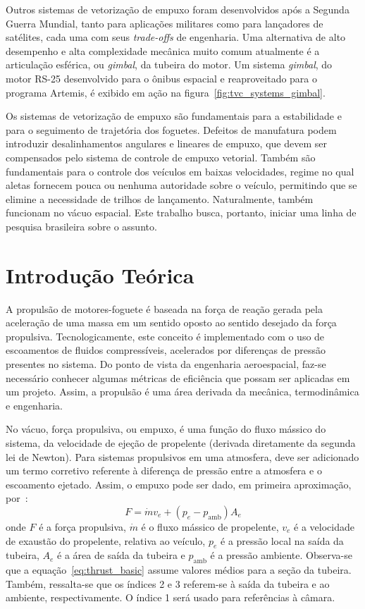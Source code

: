 Outros sistemas de vetorização de empuxo foram desenvolvidos após a Segunda Guerra Mundial, tanto para aplicações militares como para lançadores de satélites, cada uma com seus \textit{trade-offs} de engenharia. Uma alternativa de alto desempenho e alta complexidade mecânica muito comum atualmente é a articulação esférica, ou \textit{gimbal}, da tubeira do motor. Um sistema \textit{gimbal}, do motor RS-25 desenvolvido para o ônibus espacial e reaproveitado para o programa Artemis, é exibido em ação na figura~\ref{fig:tvc_systems_gimbal}.

Os sistemas de vetorização de empuxo são fundamentais para a estabilidade e para o seguimento de trajetória dos foguetes. Defeitos de manufatura podem introduzir desalinhamentos angulares e lineares de empuxo, que devem ser compensados pelo sistema de controle de empuxo vetorial. Também são fundamentais para o controle dos veículos em baixas velocidades, regime no qual aletas fornecem pouca ou nenhuma autoridade sobre o veículo, permitindo que se elimine a necessidade de trilhos de lançamento. Naturalmente, também funcionam no vácuo espacial. Este trabalho busca, portanto, iniciar uma linha de pesquisa brasileira sobre o assunto.

\section{Introdução Teórica}\label{sec:intro}
A propulsão de motores-foguete é baseada na força de reação gerada pela aceleração de uma massa em um sentido oposto ao sentido desejado da força propulsiva. Tecnologicamente, este conceito é implementado com o uso de escoamentos de fluidos compressíveis, acelerados por diferenças de pressão presentes no sistema. Do ponto de vista da engenharia aeroespacial, faz-se necessário conhecer algumas métricas de eficiência que possam ser aplicadas em um projeto. Assim, a propulsão é uma área derivada da mecânica, termodinâmica e engenharia.

No vácuo, força propulsiva, ou empuxo, é uma função do fluxo mássico do sistema, da velocidade de ejeção de propelente (derivada diretamente da segunda lei de Newton). Para sistemas propulsivos em uma atmosfera, deve ser adicionado um termo corretivo referente à diferença de pressão entre a atmosfera e o escoamento ejetado. Assim, o empuxo pode ser dado, em primeira aproximação, por~\cite{Sutton}:
\begin{equation}
    \label{eq:thrust_basic}
    F = \dot{m} v_e + (p_e - p_{\mathrm{amb}}) A_e
\end{equation}
onde \(F\) é a força propulsiva, \(\dot{m}\) é o fluxo mássico de propelente, \(v_e\) é a velocidade de exaustão do propelente, relativa ao veículo, \(p_e\) é a pressão local na saída da tubeira, \(A_e\) é a área de saída da tubeira e \(p_{\mathrm{amb}}\) é a pressão ambiente. Observa-se que a equação~\ref{eq:thrust_basic} assume valores médios para a seção da tubeira. Também, ressalta-se que os índices 2 e 3 referem-se à saída da tubeira e ao ambiente, respectivamente. O índice 1 será usado para referências à câmara.

